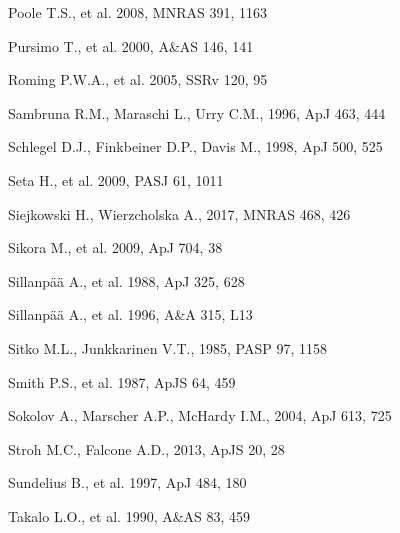 \documentclass[preprints,article,accept,moreauthors,pdftex]{Definitions/mdpi}
\begin{document}
\begin{thebibliography}{999}
Poole T.S., et al. 2008, MNRAS 391, 1163

Pursimo T., et al. 2000, A\&AS 146, 141

Roming P.W.A., et al. 2005, SSRv 120, 95  

Sambruna R.M., Maraschi L., Urry C.M., 1996, ApJ 463, 444 

Schlegel D.J., Finkbeiner D.P., Davis M., 1998, ApJ 500, 525

Seta H., et al. 2009, PASJ 61, 1011

Siejkowski H., Wierzcholska A., 2017, MNRAS 468, 426

Sikora M., et al. 2009, ApJ 704, 38

Sillanp\"a\"a A., et al. 1988, ApJ 325, 628

Sillanp\"a\"a A., et al. 1996, A\&A 315, L13

Sitko M.L., Junkkarinen V.T., 1985, PASP 97, 1158

Smith P.S., et al. 1987, ApJS 64, 459

Sokolov A., Marscher A.P., McHardy I.M., 2004, ApJ 613, 725

Stroh M.C., Falcone A.D., 2013, ApJS 20, 28

Sundelius B., et al. 1997, ApJ 484, 180

Takalo L.O., et al. 1990, A\&AS 83, 459



\end{thebibliography}
\end{document}
